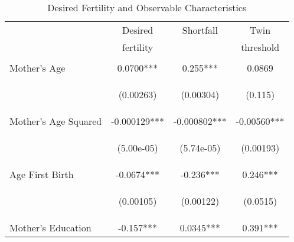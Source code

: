 \begin{table}[htpb!]
\caption{Desired Fertility and Observable Characteristics}
\begin{tabular}{lccc} \hline\hline
& Desired & Shortfall & Twin \\
& fertility & & threshold \\ \hline
\vspace{4pt} & \begin{footnotesize}\end{footnotesize} & \begin{footnotesize}\end{footnotesize} & \begin{footnotesize}\end{footnotesize} \\
Mother's Age & 0.0700*** & 0.255*** & 0.0869  \\
\vspace{4pt} & \begin{footnotesize}(0.00263)\end{footnotesize} & \begin{footnotesize}(0.00304)\end{footnotesize} & \begin{footnotesize}(0.115)\end{footnotesize} \\
Mother's Age Squared & -0.000129*** & -0.000802*** & -0.00560*** \\
\vspace{4pt} & \begin{footnotesize}(5.00e-05)\end{footnotesize} & \begin{footnotesize}(5.74e-05)\end{footnotesize} & \begin{footnotesize}(0.00193)\end{footnotesize} \\
Age First Birth & -0.0674*** & -0.236*** & 0.246*** \\
\vspace{4pt} & \begin{footnotesize}(0.00105)\end{footnotesize} & \begin{footnotesize}(0.00122)\end{footnotesize} & \begin{footnotesize}(0.0515)\end{footnotesize} \\
Mother's Education & -0.157*** & 0.0345*** & 0.391*** \\

\end{tabular}
\end{table}
